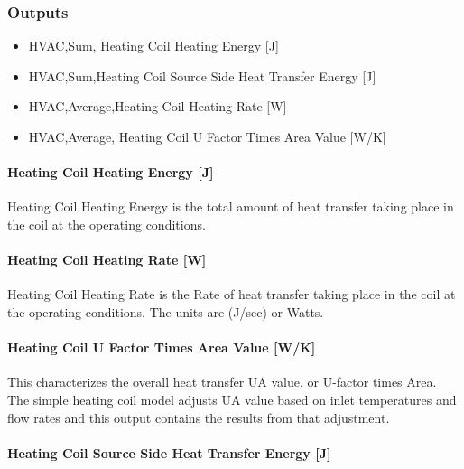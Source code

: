 \subsubsection{Outputs}\label{outputs-1-013}

\begin{itemize}
\item
  HVAC,Sum, Heating Coil Heating Energy {[}J{]}
\item
  HVAC,Sum,Heating Coil Source Side Heat Transfer Energy {[}J{]}
\item
  HVAC,Average,Heating Coil Heating Rate {[}W{]}
\item
  HVAC,Average, Heating Coil U Factor Times Area Value {[}W/K{]}
\end{itemize}

\paragraph{Heating Coil Heating Energy {[}J{]}}\label{heating-coil-heating-energy-j}

Heating Coil Heating Energy is the total amount of heat transfer taking place in the coil at the operating conditions.

\paragraph{Heating Coil Heating Rate {[}W{]}}\label{heating-coil-heating-rate-w}

Heating Coil Heating Rate is the Rate of heat transfer taking place in the coil at the operating conditions. The units are (J/sec) or Watts.

\paragraph{Heating Coil U Factor Times Area Value {[}W/K{]}}\label{heating-coil-u-factor-times-area-value-wk}

This characterizes the overall heat transfer UA value, or U-factor times Area. The simple heating coil model adjusts UA value based on inlet temperatures and flow rates and this output contains the results from that adjustment.

\paragraph{Heating Coil Source Side Heat Transfer Energy {[}J{]}}\label{heating-coil-source-side-heat-transfer-energy-j}

